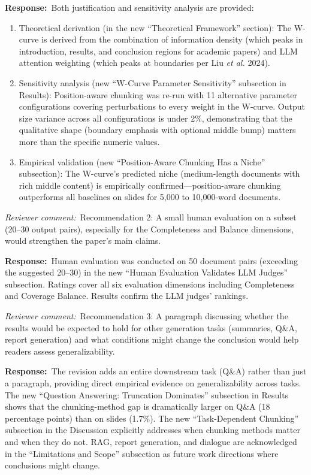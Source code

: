 \documentclass[11pt]{article}
\newcommand{\rcomment}[1]{\noindent\textcolor{revcomment}{\textit{Reviewer comment:}}~#1\par\medskip}
\newcommand{\rresponse}[1]{\noindent\textcolor{response}{\textbf{Response:}}~#1\par\medskip\medskip}
\begin{document}
\rresponse{Both justification and sensitivity analysis are provided:
\begin{enumerate}
    \item Theoretical derivation (in the new ``Theoretical Framework'' section): The W-curve is derived from the combination of information density (which peaks in introduction, results, and conclusion regions for academic papers) and LLM attention weighting (which peaks at boundaries per Liu \emph{et al.} 2024).
    \item Sensitivity analysis (new ``W-Curve Parameter Sensitivity'' subsection in Results): Position-aware chunking was re-run with 11 alternative parameter configurations covering perturbations to every weight in the W-curve. Output size variance across all configurations is under 2\%, demonstrating that the qualitative shape (boundary emphasis with optional middle bump) matters more than the specific numeric values.
    \item Empirical validation (new ``Position-Aware Chunking Has a Niche'' subsection): The W-curve's predicted niche (medium-length documents with rich middle content) is empirically confirmed---position-aware chunking outperforms all baselines on slides for 5{,}000 to 10{,}000-word documents.
\end{enumerate}}

\rcomment{Recommendation 2: A small human evaluation on a subset (20--30 output pairs), especially for the Completeness and Balance dimensions, would strengthen the paper's main claims.}

\rresponse{Human evaluation was conducted on 50 document pairs (exceeding the suggested 20--30) in the new ``Human Evaluation Validates LLM Judges'' subsection. Ratings cover all six evaluation dimensions including Completeness and Coverage Balance. Results confirm the LLM judges' rankings.}

\rcomment{Recommendation 3: A paragraph discussing whether the results would be expected to hold for other generation tasks (summaries, Q\&A, report generation) and what conditions might change the conclusion would help readers assess generalizability.}

\rresponse{The revision adds an entire downstream task (Q\&A) rather than just a paragraph, providing direct empirical evidence on generalizability across tasks. The new ``Question Answering: Truncation Dominates'' subsection in Results shows that the chunking-method gap is dramatically larger on Q\&A (18 percentage points) than on slides (1.7\%). The new ``Task-Dependent Chunking'' subsection in the Discussion explicitly addresses when chunking methods matter and when they do not. RAG, report generation, and dialogue are acknowledged in the ``Limitations and Scope'' subsection as future work directions where conclusions might change.}
\end{document}
